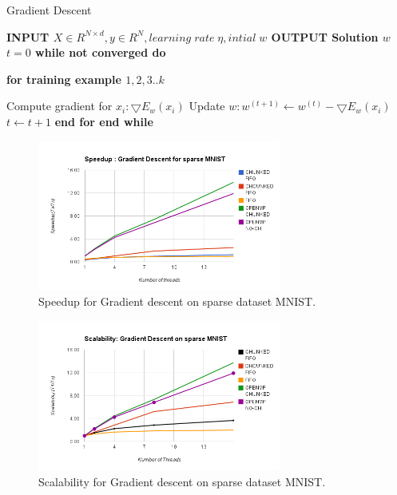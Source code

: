 \documentclass{sigplanconf}
\newlength\myindent
\newcommand\bindent{
  \begingroup
  \setlength{\itemindent}{\myindent}
  \addtolength{\algorithmicindent}{\myindent}
}
\newcommand\eindent{\endgroup}
\newlength\mysecindent
\newcommand\quadindent{
  \begingroup
  \setlength{\itemindent}{\mysecindent}
  \addtolength{\algorithmicindent}{\mysecindent}
}
\newcommand\quadeindent{\endgroup}
\begin{document}
\begin{algorithm}
\caption{	Gradient Descent}
\begin{algorithmic} 

\STATE \bf{INPUT} \begin{math} X \in {R}^{N \times  d}, y \in R^N, learning\;  rate\;  \eta, intial\; w \end{math} 
\STATE \bf{OUTPUT} \textnormal{Solution} \begin{math}  w \end{math} 
	\STATE \textnormal{\begin{math} t = 0\end{math} }
	\STATE \bf{while} \textnormal{not converged} \bf{do}
    	\bindent
		 \STATE \bf{for} \textnormal{\indent training example \begin{math}1,2,3..k\end{math}}
		\quadindent
			 \STATE \textnormal{\indent Compute gradient for \begin{math}x_i: \bigtriangledown{E_w(x_i)}\end{math}}
			 \STATE \textnormal{\indent Update \begin{math}w: w^{(t+1)} \gets w^{(t)} - \bigtriangledown{E_w(x_i)}\end{math}}
			 \STATE \textnormal{\indent \begin{math}t \gets t + 1\end{math}}
		\quadeindent
	 \STATE \bf{end for}
	 \eindent
\STATE \bf{end while}

\end{algorithmic}
\end{algorithm}

\begin{figure}[ht!]
\centering
\includegraphics[width=80mm]{gd_speed_sparse.png}
\caption{Speedup for Gradient descent on sparse dataset MNIST. }
\label{overflow}
\end{figure}


\begin{figure}[ht!]
\centering
\includegraphics[width=80mm]{gd_scale_sparse.png}
\caption{Scalability for Gradient descent on sparse dataset MNIST. }
\label{overflow}
\end{figure}
\end{document}
